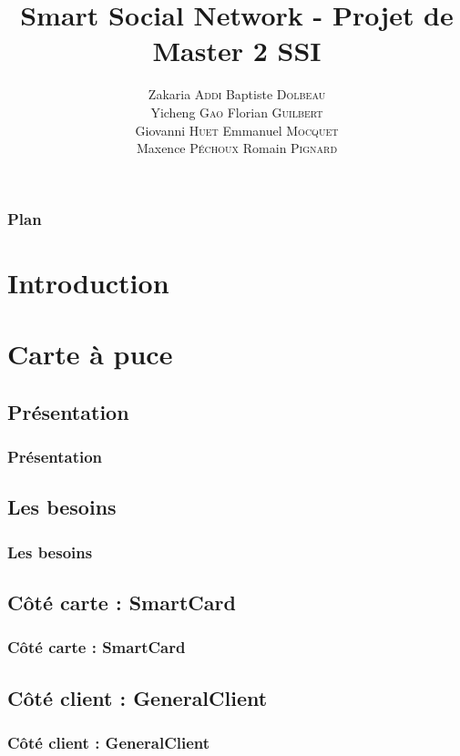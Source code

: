 \documentclass{beamer}
\title{Smart Social Network - Projet de Master 2 SSI}
\author{
    Zakaria \textsc{Addi}
    Baptiste \textsc{Dolbeau}\\
    Yicheng \textsc{Gao}
    Florian \textsc{Guilbert}\\
    Giovanni \textsc{Huet}
    Emmanuel \textsc{Mocquet}\\
    Maxence \textsc{Péchoux}
    Romain \textsc{Pignard}
}
\institute{Université de Rouen}
\begin{document}
\begin{frame}
\titlepage 
\end{frame}

\begin{frame}
\frametitle{Plan}
\tableofcontents%
\end{frame}

\section{Introduction}

\section{Carte à puce}

\subsection{Présentation}
\begin{frame}
    \frametitle{Présentation}
    \begin{block}{}
    \end{block}
\end{frame}


\subsection{Les besoins}
\begin{frame}
    \frametitle{Les besoins}
    \begin{block}{}
    \end{block}
\end{frame}

\subsection{Côté carte : SmartCard }
\begin{frame}
    \frametitle{Côté carte : SmartCard}
    \begin{block}{}
    \end{block}
\end{frame}

\subsection{Côté client : GeneralClient}
\begin{frame}
    \frametitle{Côté client : GeneralClient}
    \begin{block}{}
    \end{block}
\end{frame}
\end{document}
